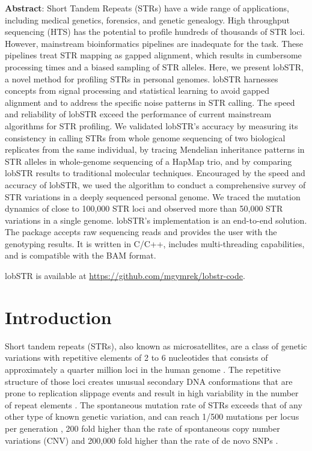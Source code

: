 \textbf{Abstract}: Short Tandem Repeats (STRs) have a wide range of applications, including medical genetics, forensics, and genetic genealogy. High throughput sequencing (HTS) has the potential to profile hundreds of thousands of STR loci. However, mainstream bioinformatics pipelines are inadequate for the task. These pipelines treat STR mapping as gapped alignment, which results in cumbersome processing times and a biased sampling of STR alleles. Here, we present lobSTR, a novel method for profiling STRs in personal genomes. lobSTR harnesses concepts from signal processing and statistical learning to avoid gapped alignment and to address the specific noise patterns in STR calling. The speed and reliability of lobSTR exceed the performance of current mainstream algorithms for STR profiling. We validated lobSTR's accuracy by measuring its consistency in calling STRs from whole genome sequencing of two biological replicates from the same individual, by tracing Mendelian inheritance patterns in STR alleles in whole-genome sequencing of a HapMap trio, and by comparing lobSTR results to traditional molecular techniques. Encouraged by the speed and accuracy of lobSTR, we used the algorithm to conduct a comprehensive survey of STR variations in a deeply sequenced personal genome. We traced the mutation dynamics of close to 100,000 STR loci and observed more than 50,000 STR variations in a single genome. lobSTR's implementation is an end-to-end solution. The package accepts raw sequencing reads and provides the user with the genotyping results. It is written in C/C++, includes multi-threading capabilities, and is compatible with the BAM format.

lobSTR is available at \url{https://github.com/mgymrek/lobstr-code}.

\section{Introduction}
Short tandem repeats (STRs), also known as microsatellites, are a class of genetic variations with repetitive elements of 2 to 6 nucleotides that consists of approximately a quarter million loci in the human genome \cite{Benson1999}. The repetitive structure of those loci creates unusual secondary DNA conformations that are prone to replication slippage events and result in high variability in the number of repeat elements \cite{Mirkin2007}. The spontaneous mutation rate of STRs exceeds that of any other type of known genetic variation, and can reach 1/500 mutations per locus per generation \cite{Walsh2001,BallantyneGoedbloedFangEtAl2010}, 200 fold higher than the rate of spontaneous copy number variations (CNV) \cite{Lupski2007} and 200,000 fold higher than the rate of de novo SNPs \cite{ConradKeeblerDePristoEtAl2011}.

